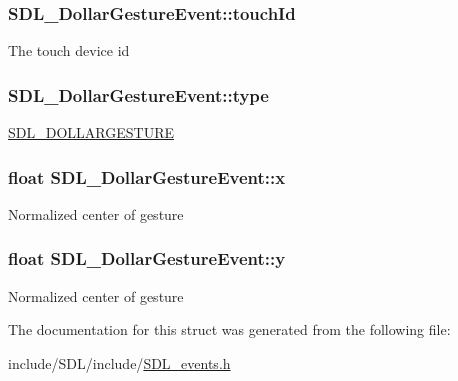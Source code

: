 \hypertarget{struct_s_d_l___dollar_gesture_event_a40402f6911ed0dba48e6b23aa02bd83d}{
\subsubsection[{touch\-Id}]{ S\-D\-L\-\_\-\-Dollar\-Gesture\-Event\-::touch\-Id}}\label{struct_s_d_l___dollar_gesture_event_a40402f6911ed0dba48e6b23aa02bd83d}
The touch device id \hypertarget{struct_s_d_l___dollar_gesture_event_ac7f6948754a1b2eb36edde043bf75ce9}{
\subsubsection[{type}]{ S\-D\-L\-\_\-\-Dollar\-Gesture\-Event\-::type}}\label{struct_s_d_l___dollar_gesture_event_ac7f6948754a1b2eb36edde043bf75ce9}
\hyperlink{_s_d_l__events_8h_a3b589e89be6b35c02e0dd34a55f3fccaaac5b40f77c7e1eba688d536d465989c6}{S\-D\-L\-\_\-\-D\-O\-L\-L\-A\-R\-G\-E\-S\-T\-U\-R\-E} \hypertarget{struct_s_d_l___dollar_gesture_event_a9888449bd8842ed96494b4db16a6097b}{
\subsubsection[{x}]{\setlength{\rightskip}{0pt plus 5cm}float S\-D\-L\-\_\-\-Dollar\-Gesture\-Event\-::x}}\label{struct_s_d_l___dollar_gesture_event_a9888449bd8842ed96494b4db16a6097b}
Normalized center of gesture \hypertarget{struct_s_d_l___dollar_gesture_event_a293b2303acc1cfc63c167c5525e6eab5}{
\subsubsection[{y}]{\setlength{\rightskip}{0pt plus 5cm}float S\-D\-L\-\_\-\-Dollar\-Gesture\-Event\-::y}}\label{struct_s_d_l___dollar_gesture_event_a293b2303acc1cfc63c167c5525e6eab5}
Normalized center of gesture 

The documentation for this struct was generated from the following file\-:\begin{DoxyCompactItemize}
\item 
include/\-S\-D\-L/include/\hyperlink{_s_d_l__events_8h}{S\-D\-L\-\_\-events.\-h}\end{DoxyCompactItemize}
